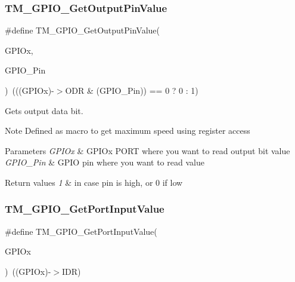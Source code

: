 \subsubsection{\texorpdfstring{T\+M\+\_\+\+G\+P\+I\+O\+\_\+\+Get\+Output\+Pin\+Value}{TM\_GPIO\_GetOutputPinValue}}
{\footnotesize\ttfamily \#define T\+M\+\_\+\+G\+P\+I\+O\+\_\+\+Get\+Output\+Pin\+Value(\begin{DoxyParamCaption}\item[{}]{G\+P\+I\+Ox,  }\item[{}]{G\+P\+I\+O\+\_\+\+Pin }\end{DoxyParamCaption})~(((G\+P\+I\+Ox)-\/$>$O\+DR \& (G\+P\+I\+O\+\_\+\+Pin)) == 0 ? 0 \+: 1)}



Gets output data bit. 

\begin{DoxyNote}{Note}
Defined as macro to get maximum speed using register access 
\end{DoxyNote}

\begin{DoxyParams}{Parameters}
{\em G\+P\+I\+Ox} & G\+P\+I\+Ox P\+O\+RT where you want to read output bit value \\
\hline
{\em G\+P\+I\+O\+\_\+\+Pin} & G\+P\+IO pin where you want to read value \\
\hline
\end{DoxyParams}

\begin{DoxyRetVals}{Return values}
{\em 1} & in case pin is high, or 0 if low \\
\hline
\end{DoxyRetVals}
\mbox{\label{group___t_m___g_p_i_o___functions_gabab8c885687b36adc083ae906f5d432e}} 
\subsubsection{\texorpdfstring{T\+M\+\_\+\+G\+P\+I\+O\+\_\+\+Get\+Port\+Input\+Value}{TM\_GPIO\_GetPortInputValue}}
{\footnotesize\ttfamily \#define T\+M\+\_\+\+G\+P\+I\+O\+\_\+\+Get\+Port\+Input\+Value(\begin{DoxyParamCaption}\item[{}]{G\+P\+I\+Ox }\end{DoxyParamCaption})~((G\+P\+I\+Ox)-\/$>$I\+DR)}



